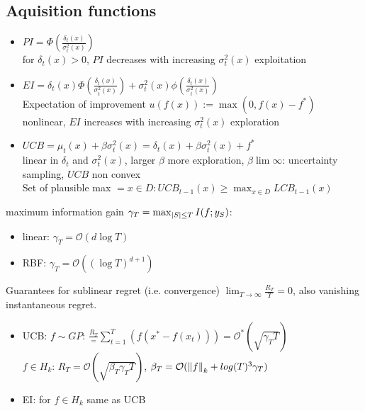 \subsection{Aquisition functions}
\begin{itemize}
    \item $PI = \Phi(\frac{\delta_{t}(x)}{\sigma_{t}^{2}(x)})$\\
    for $\delta_{t}(x) >0$, $PI$ decreases with increasing $\sigma_{t}^{2}(x)$ \textrightarrow exploitation
    \item $EI = \delta_{t}(x)\Phi(\frac{\delta_{t}(x)}{\sigma_{t}^{2}(x)}) +
    \sigma_{t}^{2}(x) \phi(\frac{\delta_{t}(x)}{\sigma_{t}^{2}(x)})$\\
    Expectation of improvement $u(f(x)):= \max(0, f(x)-f^{*})$\\
    nonlinear, $EI$ increases with increasing $\sigma_{t}^{2}(x)$ \textrightarrow exploration
    \item $UCB = \mu_{t}(x) + \beta \sigma_{t}^{2}(x) = \delta_{t}(x) + \beta \sigma_{t}^{2}(x) + f^{*}$\\
    linear in $\delta_{t}$ and $\sigma_{t}^{2}(x)$, larger $\beta$ \textrightarrow more exploration,
    $\beta \lim \infty$: uncertainty sampling, $UCB$ non convex\\
    Set of plausible max $={x \in D: UCB_{t-1}(x) \geq \max_{x \in D} LCB_{t-1}(x)}$
\end{itemize}

maximum information gain $\gamma_{T} = \max_{\left\lvert S\right\rvert \leq T} I(f;y_{S})$:
\begin{itemize}
    \item linear: $\gamma_{T} = \mathcal{O}(d \log T)$
    \item RBF: $\gamma_{T} = \mathcal{O}((\log T)^{d+1})$
\end{itemize}
Guarantees for sublinear regret (i.e. convergence) \textrightarrow $\lim_{T \rightarrow \infty} \frac{R_{T}}{T} =0$,
also vanishing instantaneous regret.
\begin{itemize}
    \item UCB:
    $f \sim GP$: $\frac{R_{T}} = \sum_{t=1}^{T}(f(x^{*}-f(x_{t}))) = \mathcal{O}^{*}(\sqrt {\gamma_{T}T})$\\
    $f \in H_{k}$: $R_{T} = \mathcal{O}(\sqrt {\beta_{T}\gamma_{T}T})$,
    $\beta_{T} = \mathcal{O}(\left\lVert f\right\rVert_{k} + log(T)^{3}\gamma_{T})$
    \item EI: for $f \in H_{k}$ same as UCB
\end{itemize}





